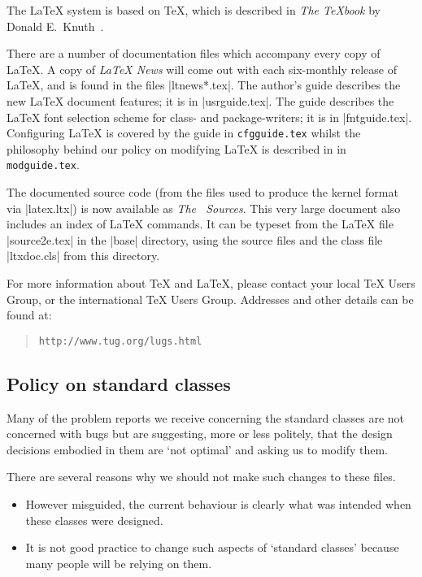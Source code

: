 \documentclass{ltxguide}[1995/11/28]
\begin{document}
The \LaTeX{} system is based on \TeX{}, which is
described in \emph{The \TeX book} by Donald E.~Knuth~\cite{A-W:DEK91}.

There are a number of documentation files which accompany every copy
of \LaTeX{}.  A copy of \emph{\LaTeX{} News} will come out with each
six-monthly release of \LaTeX{}, and is found in the files
|ltnews*.tex|.  The author's guide \emph{\usrguide} describes the new
\LaTeX{} document features; it is in |usrguide.tex|.  The guide
\emph{\fntguide} describes the \LaTeX{} font selection scheme for
class- and package-writers; it is in |fntguide.tex|. Configuring
\LaTeX{} is covered by the guide \emph{\cfgguide} in
\texttt{cfgguide.tex} whilst the philosophy behind our policy on
modifying \LaTeX{} is described in \emph{\modguide} in
\texttt{modguide.tex}.

The documented source code (from the files used to produce the kernel
format via |latex.ltx|) is now available as
\emph{The \LaTeXe\ Sources}.
This very large document also includes an index of
\LaTeX{} commands.  It can be typeset from the \LaTeX{} file
|source2e.tex| in the |base| directory, using the source files and
the class file |ltxdoc.cls| from this directory.

For more information about \TeX{} and \LaTeX{}, please contact your
local \TeX{} Users Group, or the international \TeX{} Users Group.
Addresses and other details can be found at:
\begin{quote}\small\label{addrs}
    \texttt{http://www.tug.org/lugs.html}
\end{quote}


\subsection{Policy on standard classes}

Many of the problem reports we receive concerning the standard classes
are not concerned with bugs but are suggesting, more or less politely,
that the design decisions embodied in them are `not optimal' and
asking us to modify them.

There are several reasons why we should not make such changes to these
files.
\begin{itemize}
\item
  However misguided, the current behaviour is clearly what was
  intended when these classes were designed.
\item
  It is not good practice to change such aspects of `standard classes'
  because many people will be relying on them.
\end{itemize}
\end{document}

